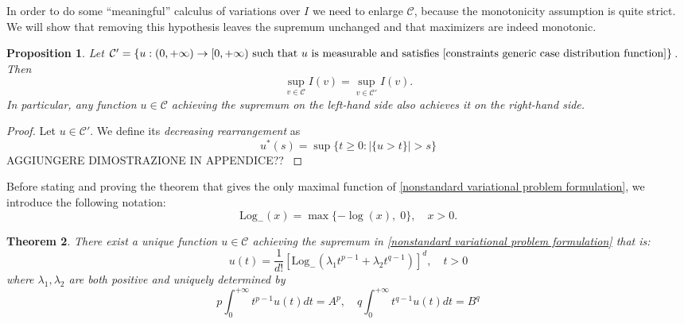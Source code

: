 \documentclass[corpo=11pt, stile=classica, tipotesi=custom,
greek, evenboxes, english]{toptesi}
\numberwithin{equation}{chapter}
\newtheorem{teo}{Theorem}[chapter] %
\newtheorem{prop}[teo]{Proposition}
\newcommand{\Log}{\ensuremath{\mathrm{Log}_-}}
\begin{document}
{\color{blue} In order to do some ``meaningful'' calculus of variations over $I$ we need to enlarge $\mathcal{C}$, because the monotonicity assumption is quite strict. We will show that removing this hypothesis leaves the supremum unchanged and that maximizers are indeed monotonic.}
\begin{prop}\label{monotonicity of maximizer}
	{\color{blue}Let $\mathcal{C}' = \{u : (0,+\infty) \rightarrow [0,+\infty) \text{ such that } u \text{ is measurable and satisfies } \eqref{constraints generic case distribution function}\}$}. Then
	\begin{equation}
		\sup_{v \in \mathcal{C}} I(v) = \sup_{v \in \mathcal{C}'} I(v).
	\end{equation}
	In particular, any function $u \in \mathcal{C}$ achieving the supremum on the left-hand side also achieves it on the right-hand side.
\end{prop}
\begin{proof}
	Let $u \in \mathcal{C}'$. We define its \emph{decreasing rearrangement} as
	\begin{equation}
		u^*(s) = \sup\{t \geq 0 : |\{u>t\}|>s\}
	\end{equation}
	{\color{blue} AGGIUNGERE DIMOSTRAZIONE IN APPENDICE?? }
\end{proof}
Before stating and proving the theorem that gives the only maximal function of \eqref{nonstandard variational problem formulation}, we introduce the following notation:
\begin{equation*}\label{Log- def}
	\Log(x) = \max\{-\log(x),\;0\}, \quad x>0.
\end{equation*}
\begin{teo}\label{nonstandard variational problem solution theorem}
	There exist a unique function $u \in \mathcal{C}$ achieving the supremum in \eqref{nonstandard variational problem formulation} that is:
	\begin{equation}\label{nonstandard variational problem solution formula}
		u(t) = \dfrac{1}{d!} \left[\Log\left(\lambda_1 t^{p-1} + \lambda_2 t^{q-1}\right)\right]^d, \quad t>0
	\end{equation}
	where $\lambda_1, \lambda_2$ are both positive and uniquely determined by
	\begin{equation*}
		p\int_0^{+\infty} t^{p-1}u(t)dt = A^p, \quad q\int_0^{+\infty} t^{q-1}u(t)dt = B^q
	\end{equation*}
\end{teo}
\end{document}
